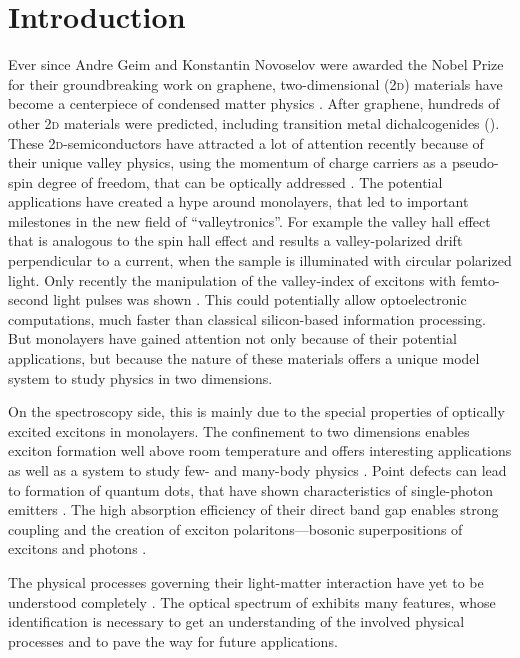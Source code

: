 \chapter{Introduction}
Ever since Andre Geim and Konstantin Novoselov were awarded the Nobel Prize for their groundbreaking work on graphene, two-dimensional (2\textsc{d}) materials have become a centerpiece of condensed matter physics \cite{novoselov_electric_2004}. After graphene, hundreds of other 2\textsc{d} materials were predicted, including transition metal dichalcogenides (\tmds\!). These 2\textsc{d}-semiconductors have attracted a lot of attention recently because of their unique valley physics, using the momentum of charge carriers as a pseudo-spin degree of freedom, that can be optically addressed \cite{wang_electronics_2012}. The potential applications have created a hype around \tmdg monolayers, that led to important milestones in the new field of ``valleytronics''. For example the valley hall effect \cite{mak_valley_2014} that is analogous to the spin hall effect and results a valley-polarized drift perpendicular to a current, when the sample is illuminated with circular polarized light. Only recently the manipulation of the valley-index of excitons with femto-second light pulses was shown \cite{langer_lightwave_2018}. This could potentially allow optoelectronic computations, much faster than classical silicon-based information processing. But \tmdg monolayers have gained attention not only because of their potential applications, but because the nature of these materials offers a unique model system to study physics in two dimensions. 

On the spectroscopy side, this is mainly due to the special properties of optically excited excitons in \tmdg monolayers. The confinement to two dimensions enables exciton formation well above room temperature and offers interesting applications as well as a system to study few- and many-body physics \cite{chernikov_exciton_2014}. Point defects can lead to formation of quantum dots, that have shown characteristics of single-photon emitters \cite{srivastava_optically_2015}. The high absorption efficiency of their direct band gap enables strong coupling and the creation of exciton polaritons---bosonic superpositions of excitons and photons \cite{liu_control_2017,zhang_photonic-crystal_2018}.

The physical processes governing their light-matter interaction have yet to be understood completely \cite{koperski_optical_2017}. The optical spectrum of \tmds exhibits many features, whose identification is necessary to get an understanding of the involved physical processes and to pave the way for future applications. 


